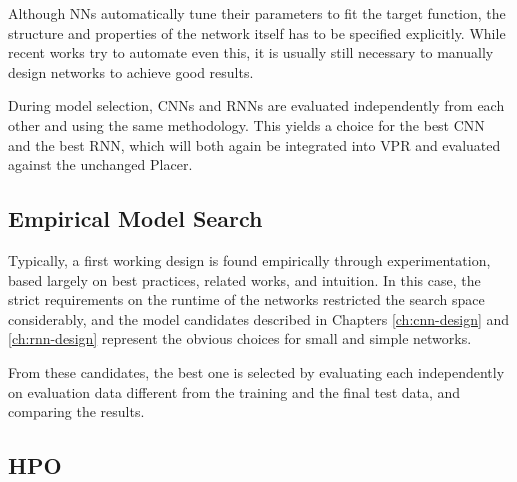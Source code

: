 Although \glspl{NN} automatically tune their parameters to fit the target function, the structure and properties of the network itself has to be specified explicitly. While recent works try to automate even this, it is usually still necessary to manually design networks to achieve good results.

During model selection, \glspl{CNN} and \glspl{RNN} are evaluated independently from each other and using the same methodology. This yields a choice for the best \gls{CNN} and the best \gls{RNN}, which will both again be integrated into \gls{VPR} and evaluated against the unchanged Placer.  

\subsection{Empirical Model Search}

Typically, a first working design is found empirically through experimentation, based largely on best practices, related works, and intuition. In this case, the strict requirements on the runtime of the networks restricted the search space considerably, and the model candidates described in Chapters \ref{ch:cnn-design} and \ref{ch:rnn-design} represent the obvious choices for small and simple networks.

From these candidates, the best one is selected by evaluating each independently on evaluation data different from the training and the final test data, and comparing the results.

\subsection{\gls{HPO}}

